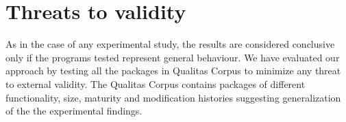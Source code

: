 \documentclass[runningheads,a4paper]{llncs}
\begin{document}




%		 





\section{Threats to validity} \label{sec:threat}
As in the case of any experimental study, the results are considered conclusive only if the programs tested represent general behaviour. We have evaluated our approach by testing all the packages in Qualitas Corpus to minimize any threat to external validity. The Qualitas Corpus contains packages of different functionality, size, maturity and modification histories suggesting generalization of the the experimental findings.
\end{document}

